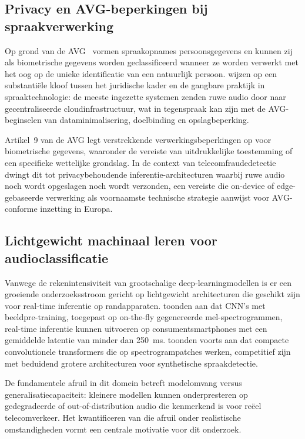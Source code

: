 \documentclass{hogent-article}
\begin{document}
\subsection{Privacy en AVG-beperkingen bij spraakverwerking}

Op grond van de AVG~\autocite{GDPR2016} vormen spraakopnames persoonsgegevens
en kunnen zij als biometrische gegevens worden geclassificeerd wanneer ze worden
verwerkt met het oog op de unieke identificatie van een natuurlijk persoon.
\textcite{Nautsch2019} wijzen op een substantiële kloof tussen het juridische
kader en de gangbare praktijk in spraaktechnologie: de meeste ingezette systemen
zenden ruwe audio door naar gecentraliseerde cloudinfrastructuur, wat in
tegenspraak kan zijn met de AVG-beginselen van dataminimalisering,
doelbinding en opslagbeperking.

Artikel~9 van de AVG legt verstrekkende verwerkingsbeperkingen op voor
biometrische gegevens, waaronder de vereiste van uitdrukkelijke toestemming
of een specifieke wettelijke grondslag. In de context van telecom\-fraude\-detectie
dwingt dit tot privacybehoudende inferentie-architecturen waarbij ruwe audio
noch wordt opgeslagen noch wordt verzonden, een vereiste die on-device of
edge-gebaseerde verwerking als voornaamste technische strategie aanwijst voor
AVG-conforme inzetting in Europa.

\subsection{Lichtgewicht machinaal leren voor audioclassificatie}

Vanwege de rekenintensiviteit van grootschalige deep-learningmodellen is er een
groeiende onderzoeksstroom gericht op lichtgewicht architecturen die geschikt zijn
voor real-time inferentie op randapparaten. \textcite{Amiriparian2022} toonden
aan dat CNN's met beeldpre-training, toegepast op on-the-fly gegenereerde
mel-spectrogrammen, real-time inferentie kunnen uitvoeren op consumentsmartphones
met een gemiddelde latentie van minder dan 250~ms. \textcite{Bartusiak2022}
toonden voorts aan dat compacte convolutionele transformers die op
spectrogrampatches werken, competitief zijn met beduidend grotere architecturen
voor synthetische spraakdetectie.

De fundamentele afruil in dit domein betreft modelomvang versus
generalisatiecapaciteit: kleinere modellen kunnen onderpresteren op gedegradeerde
of out-of-distribution audio die kenmerkend is voor reëel telecomverkeer.
Het kwantificeren van die afruil onder realistische omstandigheden vormt een
centrale motivatie voor dit onderzoek.
\end{document}
